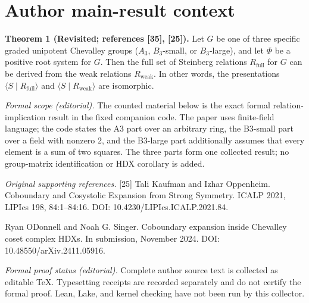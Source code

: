 \section*{Author main-result context}
\textbf{Theorem 1 (Revisited; references [35], [25]).}
Let $G$ be one of three specific graded unipotent Chevalley groups ($A_{3}$, $B_{3}$-small, or $B_{3}$-large),
and let $\Phi$ be a positive root system for $G$.
Then the full set of Steinberg relations $R_{\text{full}}$ for $G$ can be derived from the weak relations $R_{\text{weak}}$.
In other words,
the presentations $\langle S\mid R_{\text{full}}\rangle$ and $\langle S\mid R_{\text{weak}}\rangle$ are isomorphic.
\par\medskip
\noindent\textit{Formal scope (editorial).} The counted material below is the exact formal relation-implication result in the fixed companion code. The paper uses finite-field language; the code states the A3 part over an arbitrary ring, the B3-small part over a field with nonzero 2, and the B3-large part additionally assumes that every element is a sum of two squares. The three parts form one collected result; no group-matrix identification or HDX corollary is added.
\par\medskip
\noindent\textit{Original supporting references.} [25] Tali Kaufman and Izhar Oppenheim. Coboundary and Cosystolic Expansion from Strong Symmetry. ICALP 2021, LIPIcs 198, 84:1--84:16. DOI: 10.4230/LIPIcs.ICALP.2021.84.
\par
\noindent [35] Ryan O\textquotesingle Donnell and Noah G. Singer. Coboundary expansion inside Chevalley coset complex HDXs. In submission, November 2024. DOI: 10.48550/arXiv.2411.05916.
\par\medskip
\noindent\textit{Formal proof status (editorial).} Complete author source text is collected as editable TeX. Typesetting receipts are recorded separately and do not certify the formal proof. Lean, Lake, and kernel checking have not been run by this collector.

